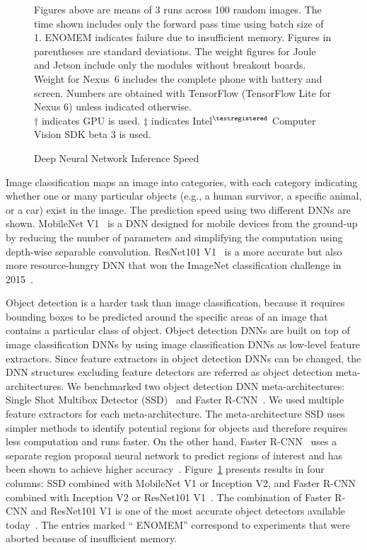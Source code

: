 \begin{figure}
\begin{captiontext}
Figures above are means of 3 runs across 100 random images. The time shown
includes only the forward pass time using batch size of 1. ENOMEM indicates
failure due to insufficient memory. Figures in parentheses are standard
deviations. The weight figures for Joule and Jetson include only the modules
without breakout boards. Weight for Nexus~6 includes the complete phone with
battery and screen. Numbers are obtained with TensorFlow (TensorFlow Lite for
Nexus 6) unless indicated otherwise. \\
$\dagger$ indicates GPU is used. $\ddagger$ indicates
Intel$^{\tiny\textregistered}$ Computer Vision SDK beta 3 is used.
\end{captiontext}
\caption{Deep Neural Network Inference Speed}
\label{fig:onboard-dnn-speed}
\end{figure}

Image classification maps an image into categories, with each category
indicating whether one or many particular objects (e.g., a human survivor, a
specific animal, or a car) exist in the image.  The prediction speed using two
different DNNs are shown. MobileNet V1~\cite{Howard2017} is a DNN
designed for mobile devices from the ground-up by reducing the number of
parameters and simplifying the computation using
depth-wise separable convolution. ResNet101 V1~\cite{He2016} is a more accurate
but also more resource-hungry DNN that won the ImageNet
classification challenge in 2015~\cite{Russakovsky15}. 

Object detection is a harder task than image classification, because it requires
bounding boxes to be predicted around the specific areas of an image that
contains a particular class of object. Object detection DNNs are built on top of
image classification DNNs by using image classification DNNs as low-level
feature extractors. Since feature extractors in object detection DNNs can be
changed, the DNN structures excluding feature detectors are referred as object
detection meta-architectures. We benchmarked two object detection DNN
meta-architectures: Single Shot Multibox Detector (SSD)~\cite{Liu2016} and
Faster R-CNN~\cite{Ren2015}. We used multiple feature extractors for each
meta-architecture. The meta-architecture SSD uses simpler methods to identify
potential regions for objects and therefore requires less computation and runs
faster. On the other hand, Faster R-CNN~\cite{Ren2015} uses a separate region
proposal neural network to predict regions of interest and has been shown to
achieve higher accuracy~\cite{Huang2017}. Figure~\ref{fig:onboard-dnn-speed}
presents results in four columns: SSD combined with MobileNet V1 or Inception
V2, and Faster R-CNN combined with Inception V2 or ResNet101 V1~\cite{He2016}.
The combination of Faster R-CNN and ResNet101 V1 is one of the most accurate
object detectors available today~\cite{Russakovsky15}. The entries marked ``{\sc
ENOMEM}'' correspond to experiments that were aborted because of insufficient
memory.

